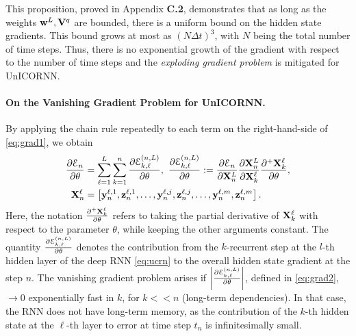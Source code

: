 \documentclass{article}
\newcommand{\by}{{\bf y}}
\newcommand{\bz}{{\bf z}}
\newcommand{\bw}{{\bf w}}
\newcommand{\bV}{{\bf V}}
\newcommand{\bX}{{\bf X}}
\newcommand{\Dt}{{\Delta t}}
\newcommand{\E}{\EuScript{E}}
\begin{document}
This proposition, proved in Appendix {\bf C.2}, demonstrates that as long as the weights $\bw^L,\bV^q$ are bounded, there is a uniform bound on the hidden state gradients. This bound grows at most as $(N\Dt)^3$, with $N$ being the total number of time steps. Thus, there is no exponential growth of the gradient with respect to the number of time steps and the \emph{exploding gradient problem} is mitigated for UnICORNN.
\paragraph{On the Vanishing Gradient Problem for UnICORNN.}
By applying the chain rule repeatedly to each term on the right-hand-side of \eqref{eq:grad1}, we obtain 
\begin{equation}
\label{eq:grad2}
\begin{aligned}
\frac{\partial \E_n}{\partial \theta} &=\sum\limits_{\ell=1}^L\sum\limits_{k=1}^n \frac{\partial \E^{(n,L)}_{k,\ell}}{\partial \theta},~\frac{\partial \E^{(n,L)}_{k,\ell}}{\partial \theta}:= \frac{\partial \E_n}{\partial \bX^L_n} \frac{\partial \bX^L_n}{\partial \bX^\ell_k} \frac{\partial^{+} \bX^\ell_k}{\partial \theta}, \\
\bX^\ell_n &= \left[\by^{\ell,1}_n,\bz^{\ell,1}_n,\ldots,\by^{\ell,j}_n,\bz^{\ell,j}_n,\ldots,\by^{\ell,m}_n,\bz^{\ell,m}_n  \right].
\end{aligned}
\end{equation}
Here, the notation $\frac{\partial^{+} \bX^\ell_k}{\partial \theta}$ refers to taking the partial derivative of $\bX^\ell_k$ with respect to the parameter $\theta$, while keeping the other arguments constant.  The quantity $\frac{\partial \E^{(n,L)}_{k,\ell}}{\partial \theta}$ denotes the contribution from the $k$-recurrent step at the $l$-th hidden layer of the deep RNN \eqref{eq:ucrn} to the overall hidden state gradient at the step $n$. The vanishing gradient problem \citep{vanish_grad} arises if $\left | \frac{\partial \E^{(n,L)}_{k,\ell}}{\partial \theta} \right |$, defined in \eqref{eq:grad2}, $\rightarrow 0$ exponentially fast in $k$, for $k << n$ (long-term dependencies). In that case, the RNN does not have long-term memory, as the contribution of the $k$-th hidden state at the $\ell$-th layer to error at time step $t_n$ is infinitesimally small.
\end{document}
